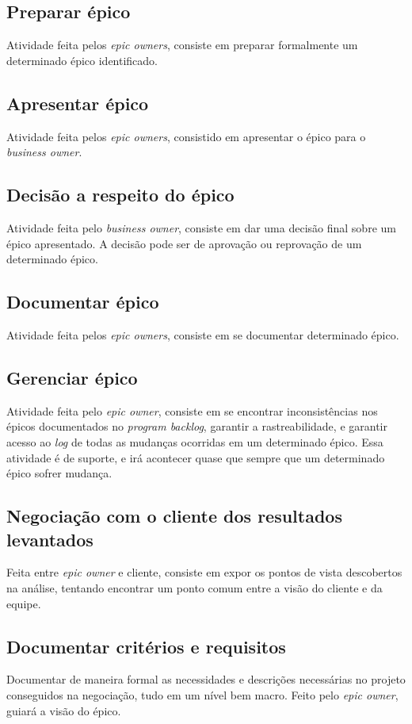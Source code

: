\subsection{Preparar épico}
Atividade feita pelos \emph{epic owners}, consiste em preparar formalmente um determinado épico identificado.

\subsection{Apresentar épico}
Atividade feita pelos \emph{epic owners}, consistido em apresentar o épico para o \emph{business owner}.

\subsection{Decisão a respeito do épico}
Atividade feita pelo \emph{business owner}, consiste em dar uma decisão final sobre um épico apresentado. A decisão pode ser de aprovação ou reprovação de um determinado épico.

\subsection{Documentar épico}
Atividade feita pelos \emph{epic owners}, consiste em se documentar determinado épico.

\subsection{Gerenciar épico}
Atividade feita pelo \emph{epic owner}, consiste em se encontrar inconsistências nos épicos documentados no \emph{program backlog}, garantir a rastreabilidade, e garantir acesso ao \emph{log} de todas as mudanças ocorridas em um determinado épico. Essa atividade é de suporte, e irá acontecer quase que sempre que um determinado épico sofrer mudança.

\subsection{Negociação com o cliente dos resultados levantados}
Feita entre \emph{epic owner} e cliente, consiste em expor os pontos de vista descobertos na análise, tentando encontrar um ponto comum entre a visão do cliente e da equipe.

\subsection{Documentar critérios e requisitos}
Documentar de maneira formal as necessidades e descrições necessárias no projeto conseguidos na negociação, tudo em um nível bem macro. Feito pelo \emph{epic owner}, guiará a visão do épico.


